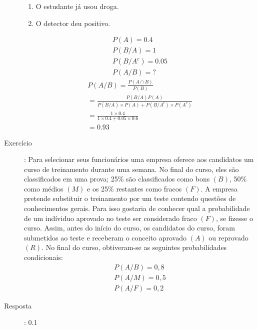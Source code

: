 \begin{description}
       \begin{enumerate}[label=\Alph*:]
         \item  O estudante já usou droga.
         \item  O detector deu positivo.
       \end{enumerate}
       \begin{align*}
         P(A)= 0.4 \\
         P( B / A )=1 \\
         P(B / A^c) = 0.05\\
         P(A / B)=?
       \end{align*}
       \begin{align*}
         P(A/B)= \frac{P(A \cap B)}{P(B)} \\
         = \frac{P(B/A)P(A)}{P(B/A)\times P(A) + P(B/A^c) \times P(A^c)}\\
         = \frac{1 \times 0.4}{1 \times 0.4 + 0.05 \times 0.6}\\
         =0.93
       \end{align*}
     \item  [Exercício]: Para selecionar seus funcionários uma empresa oferece aos candidatos 
       um curso de treinamento durante uma semana. No final do curso, eles são classificados
       em uma prova; 25\% são classificados como bons $(B)$, 50\% como médios $(M)$ e os 
       25\% restantes como fracos $(F)$. A empresa pretende substituir o treinamento por um teste 
       contendo questões de conhecimentos gerais. Para isso gostaria de conhecer qual a 
       probabilidade de um indíviduo aprovado no teste ser considerado fraco $(F)$, se 
       fizesse o curso. Assim, antes do início do curso, os candidatos do curso, foram 
       submetidos ao teste e receberam o conceito aprovado $(A)$ ou reprovado $(R)$. No final 
       do curso, obtiveram-se as seguintes probabilidades condicionais: 
       \begin{align*}
         P(A/B)= 0,8\\
         P(A/M) = 0,5\\
         P(A/F)=0,2
       \end{align*}
     \item [Resposta]: 0.1
   \end{description}
